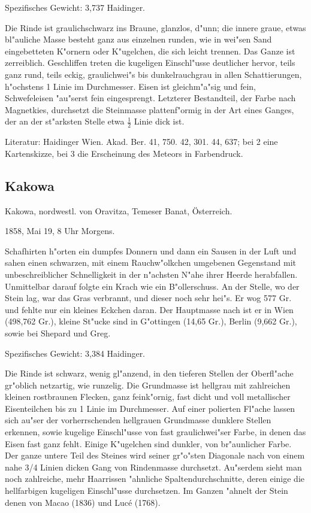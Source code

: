 \documentclass[a4paper, 11pt, oneside]{article}
\begin{document}
Spezifisches Gewicht: 3,737 Haidinger.

Die Rinde ist graulichschwarz ins Braune, glanzlos, d"unn; die innere graue, etwas bl"auliche Masse besteht ganz aus einzelnen runden, wie in wei"sen Sand eingebetteten K"ornern oder K"ugelchen, die sich leicht trennen. Das Ganze ist zerreiblich. Geschliffen treten die kugeligen Einschl"usse deutlicher hervor, teils ganz rund, teils eckig, graulichwei"s bis dunkelrauchgrau in allen Schattierungen, h"ochstens 1 Linie im Durchmesser. Eisen ist gleichm"a"sig und fein, Schwefeleisen "au"serst fein eingesprengt. Letzterer Bestandteil, der Farbe nach Magnetkies, durchsetzt die Steinmasse plattenf"ormig in der Art eines Ganges, der an der st"arksten Stelle etwa $\frac{1}{2}$ Linie dick ist.

Literatur: Haidinger Wien. Akad. Ber. 41, 750. 42, 301. 44, 637; bei 2 eine Kartenskizze, bei 3 die Erscheinung des Meteors in Farbendruck.

\subsection{Kakowa}

Kakowa, nordwestl. von Oravitza, Temeser Banat, Österreich.

1858, Mai 19, 8 Uhr Morgens.

Schafhirten h"orten ein dumpfes Donnern und dann ein Sausen in der Luft und sahen einen schwarzen, mit einem Rauchw"olkchen umgebenen Gegenstand mit unbeschreiblicher Schnelligkeit in der n"achsten N"ahe ihrer Heerde herabfallen. Unmittelbar darauf folgte ein Krach wie ein B"ollerschuss. An der Stelle, wo der Stein lag, war das Gras verbrannt, und dieser noch sehr hei"s. Er wog 577 Gr. und fehlte nur ein kleines Eckchen daran. Der Hauptmasse nach ist er in Wien (498,762 Gr.), kleine St"ucke sind in G"ottingen (14,65 Gr.), Berlin (9,662 Gr.), sowie bei Shepard und Greg.

Spezifisches Gewicht: 3,384 Haidinger.

Die Rinde ist schwarz, wenig gl"anzend, in den tieferen Stellen der Oberfl"ache gr"oblich netzartig, wie runzelig. Die Grundmasse ist hellgrau mit zahlreichen kleinen rostbraunen Flecken, ganz feink"ornig, fast dicht und voll metallischer Eisenteilchen bis zu 1 Linie im Durchmesser. Auf einer polierten Fl"ache lassen sich au"ser der vorherrschenden hellgrauen Grundmasse dunklere Stellen erkennen, sowie kugelige Einschl"usse von fast graulichwei"ser Farbe, in denen das Eisen fast ganz fehlt. Einige K"ugelchen sind dunkler, von br"aunlicher Farbe. Der ganze untere Teil des Steines wird seiner gr"o"sten Diagonale nach von einem nahe 3/4 Linien dicken Gang von Rindenmasse durchsetzt. Au"serdem sieht man noch zahlreiche, mehr Haarrissen "ahnliche Spaltendurchschnitte, deren einige die hellfarbigen kugeligen Einschl"usse durchsetzen. Im Ganzen "ahnelt der Stein denen von Macao (1836) und Lucé (1768).
\end{document}
